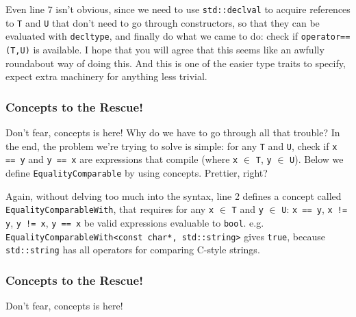     Even line 7 isn't obvious, since we need to use \texttt{std::declval} to acquire references to \texttt{T} and \texttt{U} that don't need to go through constructors, so that they can be evaluated with \texttt{decltype}, and finally do what we came to do: check if \texttt{operator==(T,U)} is available. I hope that you will agree that this seems like an awfully roundabout way of doing this. And this is one of the easier type traits to specify, expect extra machinery for anything less trivial.

    

    \subsubsection*{Concepts to the Rescue!}

    Don't fear, concepts is here! Why do we have to go through all that trouble? In the end, the problem we're trying to solve is simple: for any \texttt{T} and \texttt{U}, check if \texttt{x == y} and \texttt{y == x} are expressions that compile (where \texttt{x} $\in$ \texttt{T}, \texttt{y} $\in$ \texttt{U}). Below we define \texttt{EqualityComparable} by using concepts. Prettier, right?

    Again, without delving too much into the syntax, line 2 defines a concept called \texttt{EqualityComparableWith}, that requires for any \texttt{x} $\in$ \texttt{T} and \texttt{y} $\in$ \texttt{U}: \texttt{x == y}, \texttt{x != y}, \texttt{y != x}, \texttt{y == x} be valid expressions evaluable to \texttt{bool}. e.g. \texttt{EqualityComparableWith<const char*, std::string>} gives \texttt{true}, because \texttt{std::string} has all operators for comparing C-style strings.

    

    

    

    \newpage

    \subsubsection*{Concepts to the Rescue!}

    Don't fear, concepts is here!

    

